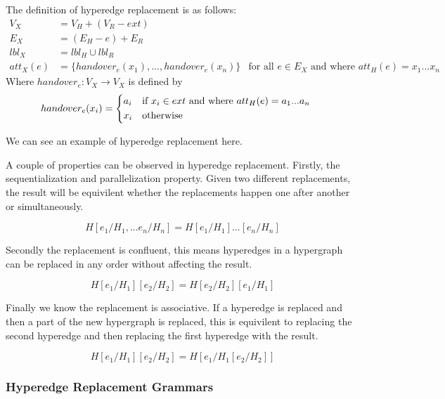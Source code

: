 \documentclass{article}
\begin{document}
    The definition of hyperedge replacement is as follows:
    \begin{align*}
    V_X &= V_H + (V_R - ext) \\
    E_X &= (E_H - e) + E_R \\
    lbl_X &= lbl_H \cup lbl_R \\
    att_X(e) &= \{handover_e(x_1),...,handover_e(x_n)\} & \text{for all $e \in E_X$ and where $att_H(e) = x_1...x_n$}
    \end{align*}
    Where $handover_e : V_X \to V_X$ is defined by
    \begin{align*}
    handover_e(x_i) &= \begin{dcases*}
    a_i & if $x_i \in ext$ and where $att_H(e) = a_1...a_n$ \\
    x_i & otherwise
    \end{dcases*}
    \end{align*}

    We can see an example of hyperedge replacement here.
    
    

    A couple of properties can be observed in hyperedge replacement. Firstly, the sequentialization and parallelization property. Given two different replacements, the result will be equivilent whether the replacements happen one after another or simultaneously.

    \begin{equation}
    H[e_1/H_1,...e_n/H_n] = H[e_1/H_1]...[e_n/H_n]
    \end{equation}

    Secondly the replacement is confluent, this means hyperedges in a hypergraph can be replaced in any order without affecting the result.

    \begin{equation}
    H[e_1/H_1][e_2/H_2] = H[e_2/H_2][e_1/H_1]
    \end{equation}

    Finally we know the replacement is associative. If a hyperedge is replaced and then a part of the new hypergraph is replaced, this is equivilent to replacing the second hyperedge and then replacing the first hyperedge with the result.

    \begin{equation}
    H[e_1/H_1][e_2/H_2] = H[e_1/H_1 [e_2/H_2]]
    \end{equation}

  \subsubsection{Hyperedge Replacement Grammars}
\end{document}
